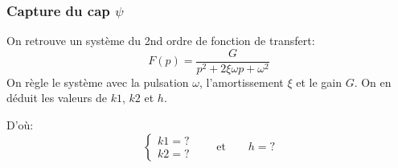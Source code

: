 \documentclass[footheight=2em]{beamer}
\begin{document}
\begin{frame}
    \frametitle{Capture du cap \( \psi \)} \pause{}
    On retrouve un système du 2nd ordre de fonction de transfert:
    \[
    F(p) = \frac{G}{p^2 + 2 \xi \omega p + \omega ^2}
    \] \pause{}
    On règle le système avec la pulsation \( \omega \), l'amortissement \( \xi \)
    et le gain \( G \).
    On en déduit les valeurs de \( k1 \), \( k2 \) et \( h \).

    D'où:
    \[
    \boxed{
    \left \{
        \begin{array}{l}
            k1 = ? \\
            k2 = ?
        \end{array}
        \right. \qquad
        \text{et} \qquad
        h =?
    }
    \]
\end{frame}
\end{document}
